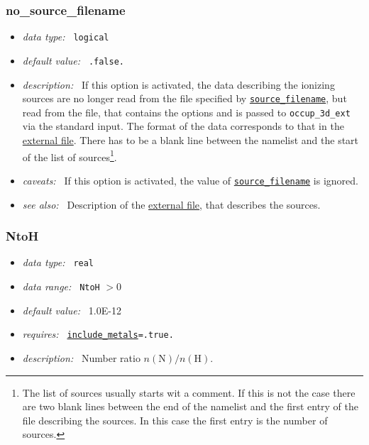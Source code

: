 \documentclass[a4paper,10pt]{article}
\begin{document}
\subsubsection{no\_source\_filename}
\label{opt:nosourcefilename}
\begin{itemize}
 \item \textit{data type:~} \texttt{logical}
 \item \textit{default value:~} \texttt{.false.} 
 \item \textit{description:~} If this option is activated, the data describing  
  the ionizing sources are no longer read from the file specified by  
  \hyperref[opt:sourcefilename]{\texttt{source\_filename}},
  but read from the file, that contains the options and is passed to 
  \texttt{occup\_3d\_ext} via the standard input. The format of the data 
  corresponds to that in the \hyperref[file:sources]{external file}.
  There has to be a blank line between the namelist and the start of the list 
  of sources\footnote{The list of sources usually starts wit a comment. If this 
  is not the case there are two blank lines between the end of the namelist and 
  the first entry of the file describing the sources. In this case the first 
  entry is the number of sources.}.
 \item \textit{caveats:~} If this option is activated, the value of 
  \hyperref[opt:sourcefilename]{\texttt{source\_filename}} is ignored.
 \item \textit{see also:~} Description of the \hyperref[file:sources]{external 
  file}, that describes the sources.
\end{itemize}

\subsubsection{NtoH}
\label{opt:ntoh}
\begin{itemize}
 \item \textit{data type:~} \texttt{real}
 \item \textit{data range:~}  \texttt{NtoH} $> 0$
 \item \textit{default value:~} 1.0E-12
 \item \textit{requires:~} \texttt{\hyperref[opt:abundreltoh]{include\_metals}=.true.}
 \item \textit{description:~} Number ratio $n(\mathrm{N})/n(\mathrm{H})$.
\end{itemize}
\end{document}
